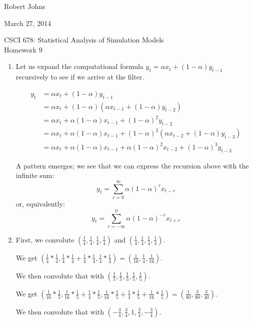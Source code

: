 \documentclass[11pt]{article} %
\begin{document}
\hfill Robert Johns

\hfill March 27, 2014

\begin{center} {\Large CSCI 678: Statistical Analysis of Simulation Models}\\{\large Homework 9}\end{center}

\begin{enumerate}

\item Let us expand the computational formula $y_t = \alpha x_t + (1 - \alpha)y_{t-1}$ recursively to see if we arrive at the filter.

\begin{align*}y_t &= \alpha x_t + (1 - \alpha)y_{t-1} \\
&= \alpha x_t + (1 - \alpha)(\alpha x_{t-1} + (1 - \alpha)y_{t - 2})\\
&= \alpha x_t + \alpha(1 - \alpha)x_{t-1} + (1 - \alpha)^2y_{t-2}\\
&= \alpha x_t + \alpha(1 - \alpha)x_{t-1} + (1 - \alpha)^2(\alpha x_{t-2} + (1-\alpha)y_{t-3})\\
&= \alpha x_t + \alpha(1 - \alpha)x_{t-1} + \alpha(1 - \alpha)^2x_{t-2} + (1-\alpha)^3y_{t-3}
\end{align*}

A pattern emerges; we see that we can express the recursion above with the infinite sum:
$$y_t = \sum_{r = 0}^\infty \alpha(1 - \alpha)^rx_{t - r}$$
or, equivalently:
$$y_t = \sum_{r = -\infty}^0\alpha(1-\alpha)^{-r}x_{t+r}$$

\item First, we convolute $\left(\frac{1}{4}, \frac{1}{4}, \frac{1}{4}, \frac{1}{4}\right)$ and $\left(\frac{1}{4}, \frac{1}{4}, \frac{1}{4}, \frac{1}{4}\right)$.

We get $\left(\frac{1}{4} * \frac{1}{4}, \frac{1}{4} * \frac{1}{4} + \frac{1}{4} * \frac{1}{4}, \frac{1}{4} * \frac{1}{4}\right) = \left(\frac{1}{16}, \frac{1}{4}, \frac{1}{16}\right)$.  

We then convolute that with $\left(\frac{1}{5}, \frac{1}{5}, \frac{1}{5}, \frac{1}{5}, \frac{1}{5}\right)$.

We get $\left(\frac{1}{16} * \frac{1}{5}, \frac{1}{16} * \frac{1}{5} + \frac{1}{4} * \frac{1}{5}, \frac{1}{16} * \frac{1}{5} + \frac{1}{4} * \frac{1}{5} + \frac{1}{16} * \frac{1}{5}\right) = \left(\frac{1}{80}, \frac{3}{80}, \frac{3}{40}\right)$.

We then convolute that with $\left(-\frac{3}{4}, \frac{3}{4}, 1, \frac{3}{4}, -\frac{3}{4}\right)$.


\end{enumerate}
\end{document}

